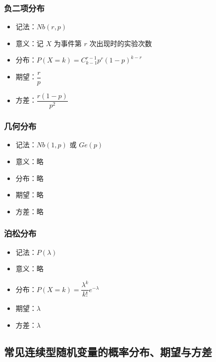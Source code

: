 \subsubsection{负二项分布}

\begin{itemize}
  \item 记法：$Nb(r, p)$
  \item 意义：记 $X$ 为事件第 $r$ 次出现时的实验次数
  \item 分布：$P(X = k) = C_{k - 1}^{r - 1} p^r (1-p)^{k - r}$
  \item 期望：$\dfrac{r}{p}$
  \item 方差：$\dfrac{r(1 - p)}{p^2}$
\end{itemize}

\subsubsection{几何分布}

\begin{itemize}
  \item 记法：$Nb(1, p)$ 或 $Ge(p)$
  \item 意义：略
  \item 分布：略
  \item 期望：略
  \item 方差：略
\end{itemize}

\subsubsection{泊松分布}

\begin{itemize}
  \item 记法：$P(\lambda)$
  \item 意义：略
  \item 分布：$P(X = k) = \dfrac{\lambda^k}{k!} e^{-\lambda}$
  \item 期望：$\lambda$
  \item 方差：$\lambda$
\end{itemize}


\subsection{常见连续型随机变量的概率分布、期望与方差}

